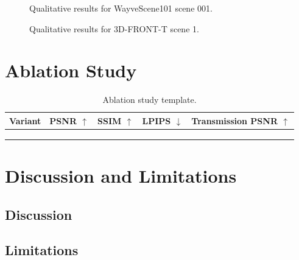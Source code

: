\begin{figure}[!htbp]
  \centering
  \caption{Qualitative results for WayveScene101 scene 001.}
  \label{fig:results-wayve}
\end{figure}

\begin{figure}[!htbp]
  \centering
  \caption{Qualitative results for 3D-FRONT-T scene 1.}
  \label{fig:results-3dfront}
\end{figure}

\clearpage
\section{Ablation Study}

\begin{table}[!htbp]
  \centering
  \caption{Ablation study template.}
  \label{tab:ablation-results}
  \renewcommand{\arraystretch}{1.5}
  \begin{tabularx}{\linewidth}{@{}Xcccc@{}}
    \toprule
    Variant & PSNR $\uparrow$ & SSIM $\uparrow$ & LPIPS $\downarrow$
            & \shortstack{Transmission\\PSNR $\uparrow$}\\
    \midrule
    \strut & & & & \\
    \strut & & & & \\
    \strut & & & & \\
    \bottomrule
  \end{tabularx}
\end{table}

\vspace{2cm}

\section{Discussion and Limitations}
\subsection*{Discussion}
\vspace{2.5cm}

\subsection*{Limitations}
\vspace{2.5cm}
